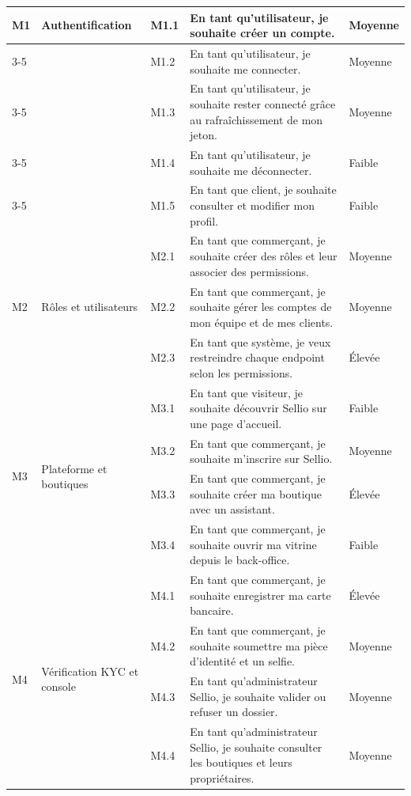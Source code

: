 \begin{longtable}{|p{0.9cm}|p{3cm}|p{1.3cm}|p{6.6cm}|p{1.9cm}|}
\multirow{5}{*}{M1} & \multirow{5}{3cm}{Authentification} & M1.1 & En tant qu'utilisateur, je souhaite créer un compte. & Moyenne \\
\cline{3-5}
 & & M1.2 & En tant qu'utilisateur, je souhaite me connecter. & Moyenne \\
\cline{3-5}
 & & M1.3 & En tant qu'utilisateur, je souhaite rester connecté grâce au rafraîchissement de mon jeton. & Moyenne \\
\cline{3-5}
 & & M1.4 & En tant qu'utilisateur, je souhaite me déconnecter. & Faible \\
\cline{3-5}
 & & M1.5 & En tant que client, je souhaite consulter et modifier mon profil. & Faible \\
\hline
\multirow{3}{*}{M2} & \multirow{3}{3cm}{Rôles et utilisateurs} & M2.1 & En tant que commerçant, je souhaite créer des rôles et leur associer des permissions. & Moyenne \\
\cline{3-5}
 & & M2.2 & En tant que commerçant, je souhaite gérer les comptes de mon équipe et de mes clients. & Moyenne \\
\cline{3-5}
 & & M2.3 & En tant que système, je veux restreindre chaque endpoint selon les permissions. & Élevée \\
\hline
\multirow{4}{*}{M3} & \multirow{4}{3cm}{Plateforme et boutiques} & M3.1 & En tant que visiteur, je souhaite découvrir Sellio sur une page d'accueil. & Faible \\
\cline{3-5}
 & & M3.2 & En tant que commerçant, je souhaite m'inscrire sur Sellio. & Moyenne \\
\cline{3-5}
 & & M3.3 & En tant que commerçant, je souhaite créer ma boutique avec un assistant. & Élevée \\
\cline{3-5}
 & & M3.4 & En tant que commerçant, je souhaite ouvrir ma vitrine depuis le back-office. & Faible \\
\hline
\multirow{5}{*}{M4} & \multirow{5}{3cm}{Vérification KYC et console} & M4.1 & En tant que commerçant, je souhaite enregistrer ma carte bancaire. & Élevée \\
\cline{3-5}
 & & M4.2 & En tant que commerçant, je souhaite soumettre ma pièce d'identité et un selfie. & Moyenne \\
\cline{3-5}
 & & M4.3 & En tant qu'administrateur Sellio, je souhaite valider ou refuser un dossier. & Moyenne \\
\cline{3-5}
 & & M4.4 & En tant qu'administrateur Sellio, je souhaite consulter les boutiques et leurs propriétaires. & Moyenne \\

\end{longtable}
